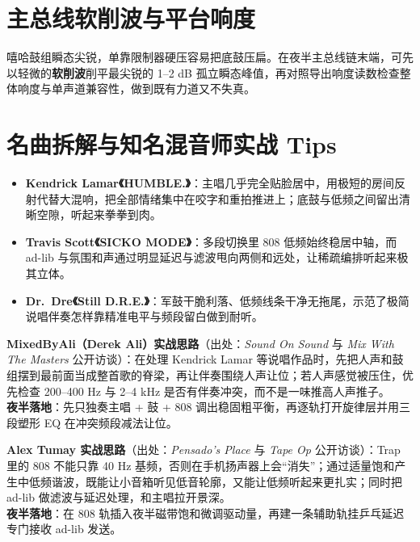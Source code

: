 \section{主总线软削波与平台响度}

嘻哈鼓组瞬态尖锐，单靠限制器硬压容易把底鼓压扁。在夜半主总线链末端，可先以轻微的\textbf{软削波}削平最尖锐的 1--2 dB 孤立瞬态峰值，再对照导出响度读数检查整体响度与单声道兼容性，做到既有力道又不失真。

\section{名曲拆解与知名混音师实战 Tips}

\begin{itemize}
  \item \textbf{Kendrick Lamar《HUMBLE.》}：主唱几乎完全贴脸居中，用极短的房间反射代替大混响，把全部情绪集中在咬字和重拍推进上；底鼓与低频之间留出清晰空隙，听起来拳拳到肉。
  \item \textbf{Travis Scott《SICKO MODE》}：多段切换里 808 低频始终稳居中轴，而 ad-lib 与氛围和声通过明显延迟与滤波甩向两侧和远处，让稀疏编排听起来极其立体。
  \item \textbf{Dr.\ Dre《Still D.R.E.》}：军鼓干脆利落、低频线条干净无拖尾，示范了极简说唱伴奏怎样靠精准电平与频段留白做到耐听。
\end{itemize}

\begin{tipbox}
\textbf{MixedByAli（Derek Ali）实战思路}（出处：\emph{Sound On Sound} 与 \emph{Mix With The Masters} 公开访谈）：在处理 Kendrick Lamar 等说唱作品时，先把人声和鼓组摆到最前面当成整首歌的脊梁，再让伴奏围绕人声让位；若人声感觉被压住，优先检查 200--400 Hz 与 2--4 kHz 是否有伴奏冲突，而不是一味推高人声推子。\\
\textbf{夜半落地}：先只独奏主唱 + 鼓 + 808 调出稳固粗平衡，再逐轨打开旋律层并用三段塑形 EQ 在冲突频段减法让位。
\end{tipbox}

\begin{tipbox}
\textbf{Alex Tumay 实战思路}（出处：\emph{Pensado's Place} 与 \emph{Tape Op} 公开访谈）：Trap 里的 808 不能只靠 40 Hz 基频，否则在手机扬声器上会“消失”；通过适量饱和产生中低频谐波，既能让小音箱听见低音轮廓，又能让低频听起来更扎实；同时把 ad-lib 做滤波与延迟处理，和主唱拉开景深。\\
\textbf{夜半落地}：在 808 轨插入夜半磁带饱和微调驱动量，再建一条辅助轨挂乒乓延迟专门接收 ad-lib 发送。
\end{tipbox}


